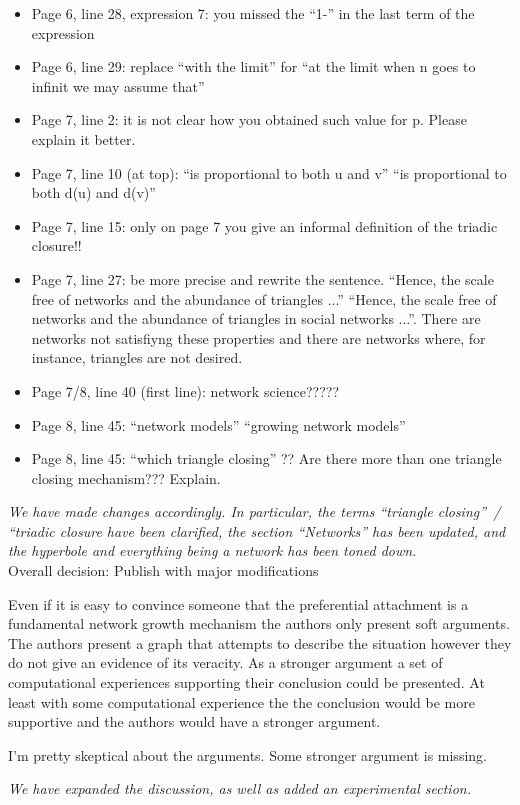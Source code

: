 \documentclass{article}
\begin{document}
\begin{itemize}
\item Page 6, line 28, expression 7: you missed the ``1-'' in the last term of the expression
\item Page 6, line 29: replace ``with the limit'' for ``at the limit when n goes to infinit we may assume that''
\item Page 7, line 2: it is not clear how you obtained such value for p. Please explain it better.
\item Page 7, line 10 (at top): ``is proportional to both u and v'' \textrightarrow{} ``is proportional to both d(u) and d(v)''
\item Page 7, line 15: only on page 7 you give an informal definition of the triadic closure!!
\item Page 7, line 27: be more precise and rewrite the sentence. ``Hence, the scale free of networks and the abundance of triangles ...'' \textrightarrow{} ``Hence, the scale free of networks and the abundance of triangles in social networks ...''. There are networks not satisfiyng these properties and there are networks where, for instance, triangles are not desired.
\item Page 7/8, line 40 (first line): network science?????
\item Page 8, line 45: ``network models'' \textrightarrow{} ``growing network models''
\item Page 8, line 45: ``which triangle closing'' ?? Are there more than one triangle closing mechanism??? Explain.
\end{itemize}
\textit{ We have made changes accordingly.  In particular, the terms
  ``triangle closing''~/ ``triadic closure have been clarified, the
  section ``Networks'' has been updated, and the hyperbole and
  everything being a network has been toned down. } \\

Overall decision: Publish with major modifications

Even if it is easy to convince someone that the preferential attachment is a fundamental network growth mechanism the authors only present soft arguments. The authors present a graph that attempts to describe the situation however they do not give an evidence of its veracity. As a stronger argument a set of computational experiences supporting their conclusion could be presented. At least with some computational experience the the conclusion would be more supportive and the authors would have a stronger argument.

I'm pretty skeptical about the arguments. Some stronger argument is
missing.

\textit{ We have expanded the discussion, as well as added an
  experimental section. } \\
\end{document}
